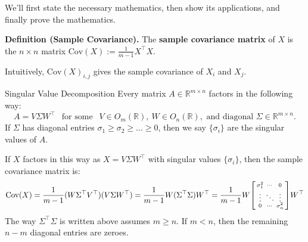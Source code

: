 We'll first state the necessary mathematics, then show its applications, and finally prove the mathematics.

\textbf{Definition (Sample Covariance).} The \textbf{sample covariance matrix} of $X$ is the $n \times n$ matrix $\mathrm{Cov}(X) := \frac{1}{m - 1} X^{\top}X$.

Intuitively, $\mathrm{Cov}(X)_{i, j}$ gives the sample covariance of $X_i$ and $X_j$.

\begin{theorem}{Singular Value Decomposition}
    Every matrix $A \in \mathbb{R}^{m \times n}$ factors in the following way:
    \[ A = V \Sigma W^{\top} ~~ \text{ for some } ~~ V \in O_m(\mathbb{R}), ~ W \in O_n(\mathbb{R}), \text{ and diagonal }  \Sigma \in \mathbb{R}^{m \times n}. \]
    If $\Sigma$ has diagonal entries $\sigma_1 \geq \sigma_2 \geq \dots \geq 0$, then we say $\{\sigma_i\}$ are the singular values of $A$.
\end{theorem}

If $X$ factors in this way as $X = V \Sigma W^{\top}$ with singular values $\{\sigma_i\}$, then the sample covariance matrix is:
\[ \mathrm{Cov}(X) = \dfrac{1}{m - 1} (W \Sigma^{\top} V^{\top}) (V \Sigma W^{\top}) = \dfrac{1}{m - 1} W (\Sigma^{\top} \Sigma)W^{\top} = \dfrac{1}{m - 1} W \begin{bsmallmatrix} \sigma_1^2 & \cdots & 0 \\ \vdots & \ddots & \vdots \\ 0 & \cdots & \sigma_n^2 \end{bsmallmatrix}W^{\top} \]
The way $\Sigma^{\top}\Sigma$ is written above assumes $m \geq n$.  If $m < n$, then the remaining $n - m$ diagonal entries are zeroes. \vspace{0.1cm}

 \vspace{0.1cm}

